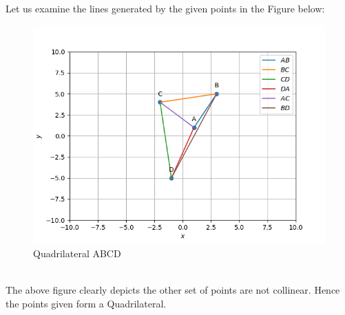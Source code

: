 \documentclass[journal,12pt,twocolumn]{IEEEtran}
\begin{document}
Let us examine the lines generated by the given points in the Figure below:
\begin{figure}[!ht]
    \centering
    \includegraphics[width=\linewidth]{QUAD.png}
    \caption{Quadrilateral ABCD}
    \label{fig:Quad ABCD}
\end{figure}
\\
The above figure clearly depicts the other set of points are not collinear. Hence the points given form a Quadrilateral.
\end{document}
